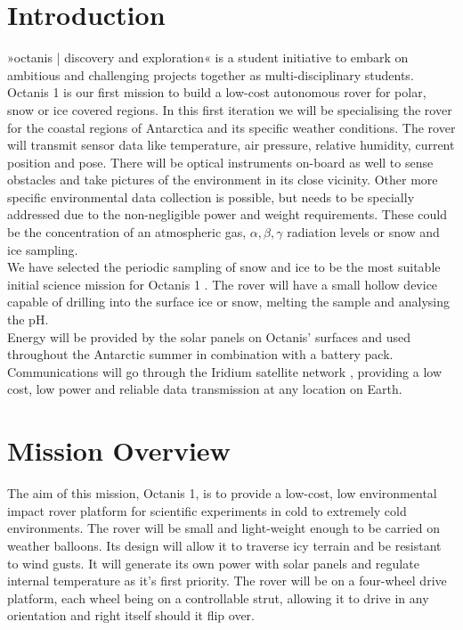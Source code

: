 \documentclass[a4paper,12pt]{article}
\begin{document}
\tableofcontents

\pagebreak

\section{Introduction}
»octanis | discovery and exploration« \cite{octanis} is a student initiative to embark on ambitious and challenging projects together as multi-disciplinary students. Octanis 1 is our first mission to build a low-cost autonomous rover for polar, snow or ice covered regions. In this first iteration we will be specialising the rover for the coastal regions of Antarctica and its specific weather conditions. The rover will transmit sensor data like temperature, air pressure, relative humidity, current position and pose. There will be optical instruments on-board as well to sense obstacles and take pictures of the environment in its close vicinity. Other more specific environmental data collection is possible, but needs to be specially addressed due to the non-negligible power and weight requirements. These could be the concentration of an atmospheric gas, $\alpha, \beta, \gamma$ radiation levels or snow and ice sampling. \\ We have selected the periodic sampling of snow and ice to be the most suitable initial science mission for Octanis 1 \cite{krishnakant}. The rover will have a small hollow device capable of drilling into the surface ice or snow, melting the sample and analysing the pH.
\\ Energy will be provided by the solar panels on Octanis' surfaces and used throughout the Antarctic summer in combination with a battery pack. Communications will go through the Iridium satellite network \cite{iridium}, providing a low cost, low power and reliable data transmission at any location on Earth. 



\section{Mission Overview}

The aim of this mission, Octanis 1, is to provide a low-cost, low environmental impact rover platform for scientific experiments in cold to extremely cold environments. The rover will be small and light-weight enough to be carried on weather balloons. Its design will allow it to traverse icy terrain and be resistant to wind gusts. It will generate its own power with solar panels and regulate internal temperature as it's first priority. The rover will be on a four-wheel drive platform, each wheel being on a controllable strut, allowing it to drive in any orientation and right itself should it flip over. 
\end{document}
